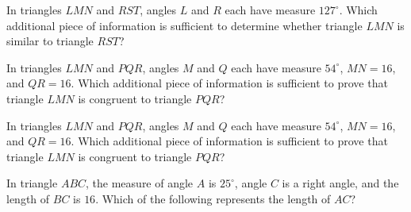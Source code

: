 In triangles $LMN$ and $RST$, angles $L$ and $R$ each have measure $127^\circ$. Which additional piece of information is sufficient to determine whether triangle $LMN$ is similar to triangle $RST$?


\vspace{2em}

\noindent\markforreview
\vspace{1em}

In triangles $LMN$ and $PQR$, angles $M$ and $Q$ each have measure $54^\circ$, $MN = 16$, and $QR = 16$. Which additional piece of information is sufficient to prove that triangle $LMN$ is congruent to triangle $PQR$?


\vspace{2em}

\noindent\markforreview
\vspace{1em}

In triangles $LMN$ and $PQR$, angles $M$ and $Q$ each have measure $54^\circ$, $MN = 16$, and $QR = 16$. Which additional piece of information is sufficient to prove that triangle $LMN$ is congruent to triangle $PQR$?


\vspace{2em}

\noindent\markforreview
\vspace{1em}

In triangle $ABC$, the measure of angle $A$ is $25^\circ$, angle $C$ is a right angle, and the length of $BC$ is $16$. Which of the following represents the length of $AC$?


\vspace{2em}

